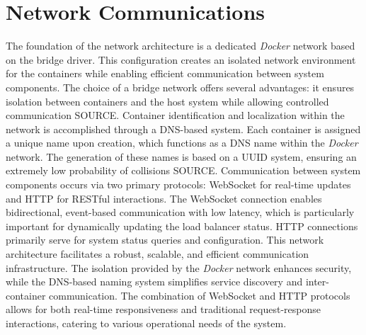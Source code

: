 \documentclass[twocolumn]{webofc}
\begin{document}
\section{Network Communications}
The foundation of the network architecture is a dedicated \textit{Docker} network based on the bridge driver. This configuration creates an isolated network environment for the containers while enabling efficient communication between system components. The choice of a bridge network offers several advantages: it ensures isolation between containers and the host system while allowing controlled communication {\color{red} SOURCE}. Container identification and localization within the network is accomplished through a DNS-based system. Each container is assigned a unique name upon creation, which functions as a DNS name within the \textit{Docker} network. The generation of these names is based on a UUID system, ensuring an extremely low probability of collisions {\color{red} SOURCE}. Communication between system components occurs via two primary protocols: WebSocket for real-time updates and HTTP for RESTful interactions. The WebSocket connection enables bidirectional, event-based communication with low latency, which is particularly important for dynamically updating the load balancer status. HTTP connections primarily serve for system status queries and configuration. This network architecture facilitates a robust, scalable, and efficient communication infrastructure. The isolation provided by the \textit{Docker} network enhances security, while the DNS-based naming system simplifies service discovery and inter-container communication. The combination of WebSocket and HTTP protocols allows for both real-time responsiveness and traditional request-response interactions, catering to various operational needs of the system.
\end{document}
